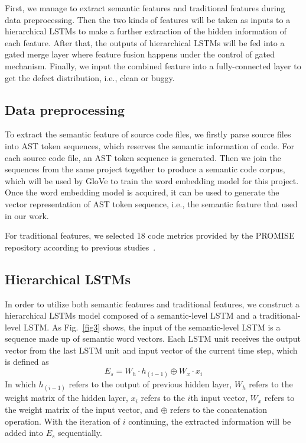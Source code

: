 \documentclass[journal]{IEEEtran}
\begin{document}
First, we manage to extract semantic features and traditional features during data preprocessing. Then the two kinds of features will be taken as inputs to a hierarchical LSTMs to make a further extraction of the hidden information of each feature. After that, the outputs of hierarchical LSTMs will be fed into a gated merge layer where feature fusion happens under the control of gated mechanism. Finally, we input the combined feature into a fully-connected layer to get the defect distribution, i.e., clean or buggy.

\subsection{Data preprocessing}
\label{data_preprocessing}
To extract the semantic feature of source code files, we firstly parse source files into AST token sequences, which reserves the semantic information of code. For each source code file, an AST token sequence is generated. Then we join the sequences from the same project together to produce a semantic code corpus, which will be used by GloVe to train the word embedding model for this project. Once the word embedding model is acquired, it can be used to generate the vector representation of AST token sequence, i.e., the semantic feature that used in our work.

For traditional features, we selected 18 code metrics provided by the PROMISE repository according to previous studies~\cite{wang2018deep,fan2019deep,ni2019empirical}.

\subsection{Hierarchical LSTMs}
In order to utilize both semantic features and traditional features, we construct a hierarchical LSTMs model composed of a semantic-level LSTM and a traditional-level LSTM. As Fig.~\ref{fig3} shows, the input of the semantic-level LSTM is a sequence made up of semantic word vectors. Each LSTM unit receives the output vector from the last LSTM unit and input vector of the current time step, which is defined as
\begin{equation}
E_{s}=W_{h}\cdot h_{(i-1)} \oplus W_{x}\cdot x_{i}
\end{equation}
In which $h_{(i-1)}$ refers to the output of previous hidden layer, $W_{h}$ refers to the weight matrix of the hidden layer, $x_{i}$ refers to the $i$th input vector, $W_{x}$ refers to the weight matrix of the input vector, and $\oplus$ refers to the concatenation operation. With the iteration of $i$ continuing, the extracted information will be added into $E_{s}$ sequentially.
\end{document}

